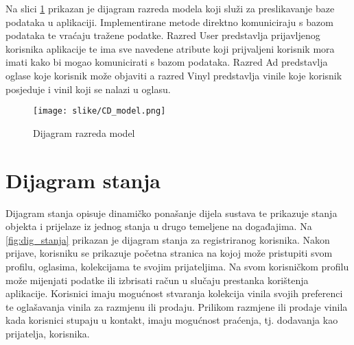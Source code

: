 			\eject
				
			Na slici \ref{fig:model} prikazan je dijagram razreda modela koji služi za preslikavanje baze podataka u aplikaciji. Implementirane metode direktno komuniciraju s bazom podataka te vraćaju tražene podatke. Razred User predstavlja prijavljenog korisnika aplikacije te ima sve navedene atribute koji prijvaljeni korisnik mora imati kako bi mogao komunicirati s bazom podataka. Razred Ad predstavlja oglase koje korisnik može objaviti a razred Vinyl predstavlja vinile koje korisnik posjeduje i vinil koji se nalazi u oglasu.
				
				\begin{figure}[H]
					\texttt{[image: slike/CD\_model.png]}
					\centering
					\caption{Dijagram razreda model}
					\label{fig:model}
				\end{figure}

			
%			
%			
			
			
			\eject
		
		\section{Dijagram stanja}
			
			
%			

		Dijagram stanja opisuje dinamičko ponašanje dijela sustava te prikazuje stanja objekta i prijelaze iz jednog stanja u drugo temeljene na događajima. Na \ref{fig:dig_stanja} prikazan je dijagram stanja za registriranog korisnika. Nakon prijave, korisniku se prikazuje početna stranica na kojoj može pristupiti svom profilu, oglasima, kolekcijama te svojim prijateljima. Na svom korisničkom profilu može mijenjati podatke ili izbrisati račun u slučaju prestanka korištenja aplikacije. Korisnici imaju mogućnost stvaranja kolekcija vinila svojih preferenci te oglašavanja vinila za razmjenu ili prodaju. Prilikom razmjene ili prodaje vinila kada korisnici stupaju u kontakt, imaju mogućnost praćenja, tj. dodavanja kao prijatelja, korisnika.

